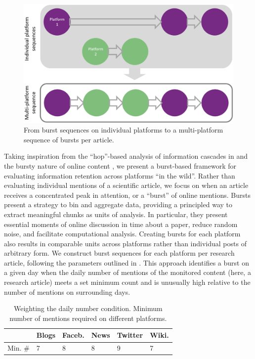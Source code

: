 \documentclass[letterpaper]{article} %
\begin{document}
\begin{figure}[t]
    \centering
    \includegraphics[width=0.95\columnwidth]{figs/multiplatform_make_ex.png}
    \caption{From burst sequences on individual platforms to a multi-platform sequence of bursts per article.}
    \label{fig:burst_example}
\end{figure}

Taking inspiration from the ``hop''-based analysis of information cascades in \citet{ribeiroMessageDistortionInformation2019} and the bursty nature of online content \citep{zakhlebinDiffusionScientificArticles2020,gilbertWidespreadUnderprovisionReddit2013,chengCascadesRecur2016}, we present a burst-based framework for evaluating information retention across platforms ``in the wild''.
Rather than evaluating individual mentions of a scientific article, we focus on when an article receives a concentrated peak in attention, or a ``burst'' of online mentions. Bursts present a strategy to bin and aggregate data, providing a principled way to extract meaningful chunks as units of analysis.
In particular, they present essential moments of online discussion in time about a paper, reduce random noise, and facilitate computational analysis. Creating bursts for each platform also results in comparable units across platforms rather than individual posts of arbitrary form. We construct burst sequences for each platform per research article, following the parameters outlined in \citet{chengCascadesRecur2016}. This approach identifies a burst on a given day when the daily number of mentions of the monitored content (here, a research article) meets a set minimum count and is unusually high relative to the number of mentions on surrounding days.

\begin{table}[t]
    \centering
    \begin{tabular}{r|l|l|l|l|l}
    & \textbf{Blogs} & \textbf{Faceb.} & \textbf{News} & \textbf{Twitter} & \textbf{Wiki.} \\
    \hline
    Min. \# & 7 & 8 & 8 & 9 & 7 \\
    \end{tabular}
    \caption{Weighting the daily number condition. Minimum number of mentions required on different platforms.}
    \label{tab:condition_1_weights}
\end{table}
\end{document}
